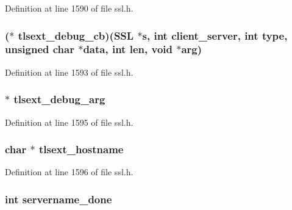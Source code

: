 Definition at line 1590 of file ssl.\+h.

\subsubsection[{\texorpdfstring{tlsext\+\_\+debug\+\_\+cb}{tlsext_debug_cb}}]{($\ast$ tlsext\+\_\+debug\+\_\+cb)({\bf S\+SL} $\ast$s, int client\+\_\+server, int {\bf type}, unsigned char $\ast$data, int {\bf len}, {\bf void} $\ast$arg)}\hypertarget{structssl__st_a22554490bacd588c43bedf120c0d9db9}{}\label{structssl__st_a22554490bacd588c43bedf120c0d9db9}


Definition at line 1593 of file ssl.\+h.

\subsubsection[{\texorpdfstring{tlsext\+\_\+debug\+\_\+arg}{tlsext_debug_arg}}]{ $\ast$ tlsext\+\_\+debug\+\_\+arg}\hypertarget{structssl__st_acb9ea3544d4a127584b2f96921f22f2e}{}\label{structssl__st_acb9ea3544d4a127584b2f96921f22f2e}


Definition at line 1595 of file ssl.\+h.

\subsubsection[{\texorpdfstring{tlsext\+\_\+hostname}{tlsext_hostname}}]{\setlength{\rightskip}{0pt plus 5cm}char $\ast$ tlsext\+\_\+hostname}\hypertarget{structssl__st_a322c71ead6960d65c1bc64bd96e1a78c}{}\label{structssl__st_a322c71ead6960d65c1bc64bd96e1a78c}


Definition at line 1596 of file ssl.\+h.

\subsubsection[{\texorpdfstring{servername\+\_\+done}{servername_done}}]{\setlength{\rightskip}{0pt plus 5cm}int servername\+\_\+done}\hypertarget{structssl__st_a3a5989c95102c3166c09e1fd4a0d1805}{}\label{structssl__st_a3a5989c95102c3166c09e1fd4a0d1805}


